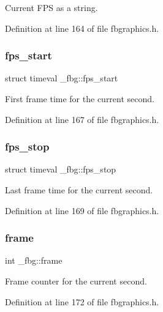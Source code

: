 Current F\+PS as a string. 



Definition at line 164 of file fbgraphics.\+h.

\mbox{\label{struct__fbg_a07d7bb827a7595c956fe22c2d65bba33}} 
\subsubsection{\texorpdfstring{fps\+\_\+start}{fps\_start}}
{\footnotesize\ttfamily struct timeval \+\_\+fbg\+::fps\+\_\+start}



First frame time for the current second. 



Definition at line 167 of file fbgraphics.\+h.

\mbox{\label{struct__fbg_ade17a45bbc82bef326857c2837cdf66c}} 
\subsubsection{\texorpdfstring{fps\+\_\+stop}{fps\_stop}}
{\footnotesize\ttfamily struct timeval \+\_\+fbg\+::fps\+\_\+stop}



Last frame time for the current second. 



Definition at line 169 of file fbgraphics.\+h.

\mbox{\label{struct__fbg_aa3ef83f919d12e680f8c64006b441454}} 
\subsubsection{\texorpdfstring{frame}{frame}}
{\footnotesize\ttfamily int \+\_\+fbg\+::frame}



Frame counter for the current second. 



Definition at line 172 of file fbgraphics.\+h.

